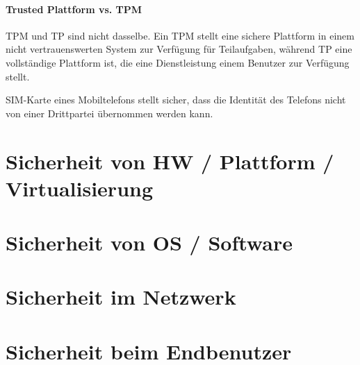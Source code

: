 \documentclass[a4paper,12pt]{article}
\begin{document}
\paragraph{Trusted Plattform vs. TPM}
TPM und TP sind nicht dasselbe. Ein TPM stellt eine sichere Plattform in einem nicht vertrauenswerten System zur Verfügung für Teilaufgaben, während TP eine vollständige Plattform ist, die eine Dienstleistung einem Benutzer zur Verfügung stellt.

SIM-Karte eines Mobiltelefons stellt sicher, dass die Identität des Telefons nicht von einer Drittpartei übernommen werden kann.

\newpage
\section{Sicherheit von HW / Plattform / Virtualisierung}

\newpage
\section{Sicherheit von OS / Software}

\newpage
\section{Sicherheit im Netzwerk}

\newpage
\section{Sicherheit beim Endbenutzer}
\end{document}
